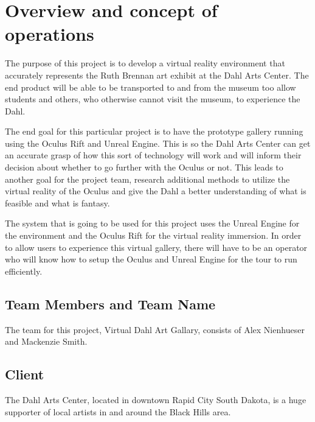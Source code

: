 

\chapter{Overview and concept of operations}

The purpose of this project is to develop a virtual reality environment that accurately represents the Ruth Brennan art exhibit at the Dahl Arts Center.  The end product will be able to be transported to and from the museum too allow students and others, who otherwise cannot visit the museum, to experience the Dahl.

The end goal for this particular project is to have the prototype gallery running using the Oculus Rift and Unreal Engine.  This is so the Dahl Arts Center can get an accurate grasp of how this sort of technology will work and will inform their decision about whether to go further with the Oculus or not.  This leads to another goal for the project team, research additional methods to utilize the virtual reality of the Oculus and give the Dahl a better understanding of what is feasible and what is fantasy.

The system that is going to be used for this project uses the Unreal Engine for the environment and the Oculus Rift for the virtual reality immersion.  In order to allow users to experience this virtual gallery, there will have to be an operator who will know how to setup the Oculus and Unreal Engine for the tour to run efficiently.  

\section{Team Members and Team Name}
The team for this project, Virtual Dahl Art Gallary, consists of Alex Nienhueser and Mackenzie Smith. 



\section{Client}
The Dahl Arts Center, located in downtown Rapid City South Dakota, is a huge supporter of local artists in and around the Black Hills area. 

